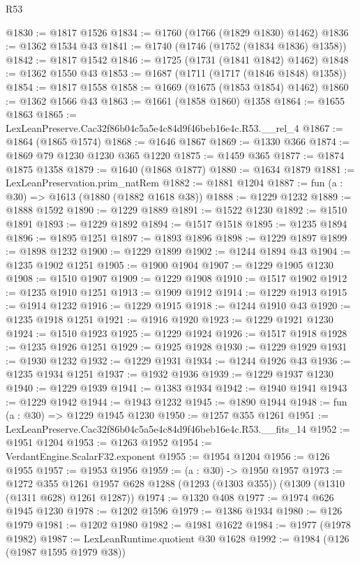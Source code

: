 \begin{lexlean}{R53}
\begin{coremodule}
@1830 := @1817 @1526
@1834 := @1760 (@1766 (@1829 @1830) @1462)
@1836 := @1362 @1534 @43
@1841 := @1740 (@1746 (@1752 (@1834 @1836) @1358))
@1842 := @1817 @1542
@1846 := @1725 (@1731 (@1841 @1842) @1462)
@1848 := @1362 @1550 @43
@1853 := @1687 (@1711 (@1717 (@1846 @1848) @1358))
@1854 := @1817 @1558
@1858 := @1669 (@1675 (@1853 @1854) @1462)
@1860 := @1362 @1566 @43
@1863 := @1661 (@1858 @1860) @1358
@1864 := @1655 @1863
@1865 := LexLeanPreserve.Cac32f86b04c5a5e4c84d9f46beb16e4c.R53.__rel_4
@1867 := @1864 (@1865 @1574)
@1868 := @1646 @1867
@1869 := @1330 @366
@1874 := @1869 @79 @1230 @1230 @365 @1220
@1875 := @1459 @365
@1877 := @1874 @1875 @1358
@1879 := @1640 (@1868 @1877)
@1880 := @1634 @1879
@1881 := LexLeanPreservation.prim_natRem
@1882 := @1881 @1204
@1887 := fun (a : @30) => @1613 (@1880 (@1882 @1618 @38))
@1888 := @1229 @1232
@1889 := @1888 @1592
@1890 := @1229 @1889
@1891 := @1522 @1230
@1892 := @1510 @1891
@1893 := @1229 @1892
@1894 := @1517 @1518
@1895 := @1235 @1894
@1896 := @1895 @1251
@1897 := @1893 @1896
@1898 := @1229 @1897
@1899 := @1898 @1232
@1900 := @1229 @1899
@1902 := @1244 @1894 @43
@1904 := @1235 @1902 @1251
@1905 := @1900 @1904
@1907 := @1229 @1905 @1230
@1908 := @1510 @1907
@1909 := @1229 @1908
@1910 := @1517 @1902
@1912 := @1235 @1910 @1251
@1913 := @1909 @1912
@1914 := @1229 @1913
@1915 := @1914 @1232
@1916 := @1229 @1915
@1918 := @1244 @1910 @43
@1920 := @1235 @1918 @1251
@1921 := @1916 @1920
@1923 := @1229 @1921 @1230
@1924 := @1510 @1923
@1925 := @1229 @1924
@1926 := @1517 @1918
@1928 := @1235 @1926 @1251
@1929 := @1925 @1928
@1930 := @1229 @1929
@1931 := @1930 @1232
@1932 := @1229 @1931
@1934 := @1244 @1926 @43
@1936 := @1235 @1934 @1251
@1937 := @1932 @1936
@1939 := @1229 @1937 @1230
@1940 := @1229 @1939
@1941 := @1383 @1934
@1942 := @1940 @1941
@1943 := @1229 @1942
@1944 := @1943 @1232
@1945 := @1890 @1944
@1948 := fun (a : @30) => @1229 @1945 @1230
@1950 := @1257 @355 @1261
@1951 := LexLeanPreserve.Cac32f86b04c5a5e4c84d9f46beb16e4c.R53.__fits_14
@1952 := @1951 @1204
@1953 := @1263 @1952
@1954 := VerdantEngine.ScalarF32.exponent
@1955 := @1954 @1204
@1956 := @126 @1955
@1957 := @1953 @1956
@1959 := (a : @30) -> @1950 @1957
@1973 := @1272
    @355
    @1261
    @1957
    @628
    @1288
    (@1293 (@1303 @355))
    (@1309 (@1310 (@1311 @628) @1261 @1287))
@1974 := @1320 @408
@1977 := @1974 @626 @1945 @1230
@1978 := @1202 @1596
@1979 := @1386 @1934
@1980 := @126 @1979
@1981 := @1202 @1980
@1982 := @1981 @1622
@1984 := @1977 (@1978 @1982)
@1987 := LexLeanRuntime.quotient @30 @1628
@1992 := @1984 (@126 (@1987 @1595 @1979 @38))

\end{coremodule}
\end{lexlean}
